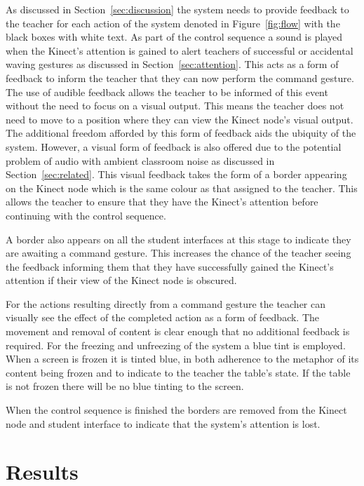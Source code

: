\documentclass[manuscript, review, screen]{acmart}
\begin{document}
As discussed in Section~\ref{sec:discussion} the system needs to provide feedback to the teacher for each action of the system denoted in Figure~\ref{fig:flow} with the black boxes with white text.
As part of the control sequence a sound is played when the Kinect's attention is gained to alert teachers of successful or accidental waving gestures as discussed in Section~\ref{sec:attention}.
This acts as a form of feedback to inform the teacher that they can now perform the command gesture.
The use of audible feedback allows the teacher to be informed of this event without the need to focus on a visual output.
This means the teacher does not need to move to a position where they can view the Kinect node's visual output.
The additional freedom afforded by this form of feedback aids the ubiquity of the system.
However, a visual form of feedback is also offered due to the potential problem of audio with ambient classroom noise as discussed in Section~\ref{sec:related}.
This visual feedback takes the form of a border appearing on the Kinect node which is the same colour as that assigned to the teacher.
This allows the teacher to ensure that they have the Kinect's attention before continuing with the control sequence.

A border also appears on all the student interfaces at this stage to indicate they are awaiting a command gesture.
This increases the chance of the teacher seeing the feedback informing them that they have successfully gained the Kinect's attention if their view of the Kinect node is obscured.

For the actions resulting directly from a command gesture the teacher can visually see the effect of the completed action as a form of feedback.
The movement and removal of content is clear enough that no additional feedback is required.
For the freezing and unfreezing of the system a blue tint is employed.
When a screen is frozen it is tinted blue, in both adherence to the metaphor of its content being frozen and to indicate to the teacher the table's state.
If the table is not frozen there will be no blue tinting to the screen.

When the control sequence is finished the borders are removed from the Kinect node and student interface to indicate that the system's attention is lost.


\section{Results}
\label{sec:results}  
\end{document}
